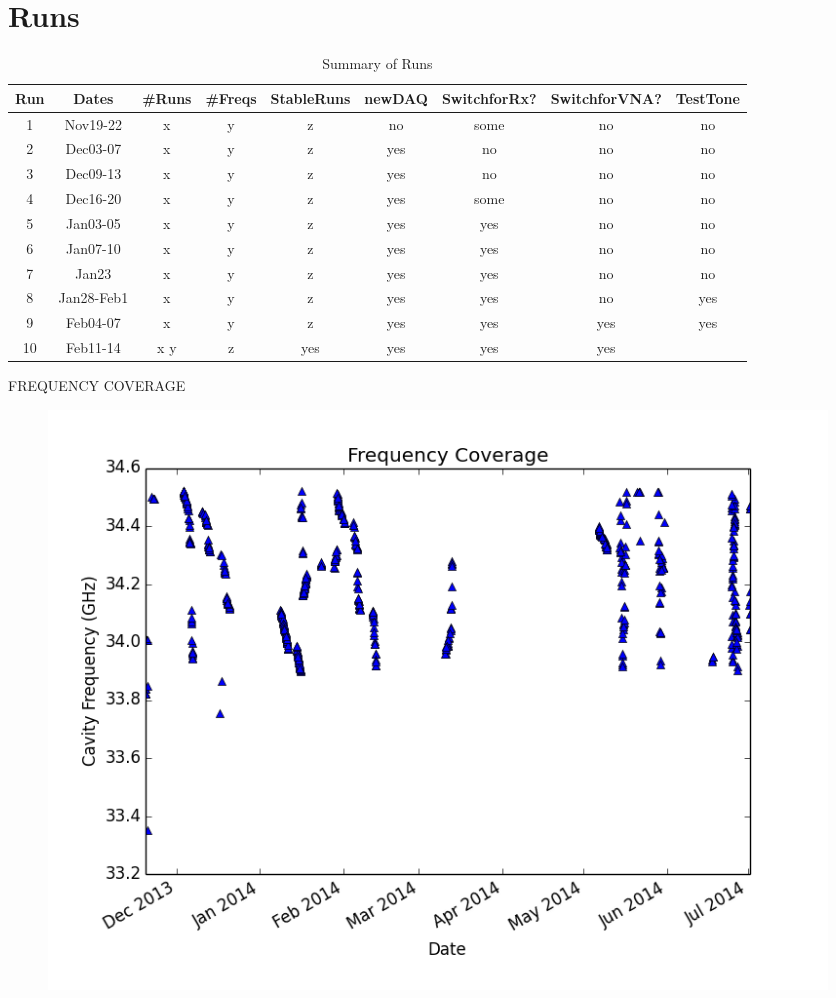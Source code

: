 \documentclass[11pt]{article}
\begin{document}
\section{Runs}

\begin{table}[ht]
\caption{Summary of Runs}

\begin{tabular}{c c c c c c c c c}
\hline\hline
Run & Dates & \#Runs & \#Freqs & StableRuns & newDAQ & SwitchforRx? & SwitchforVNA? & TestTone \\ [0.5ex]
\hline
1 & Nov19-22 & x & y & z & no & some & no & no \\
2 & Dec03-07 & x & y & z & yes & no & no & no \\
3 & Dec09-13 & x & y & z & yes & no & no & no \\
4 & Dec16-20 & x & y & z & yes & some & no & no \\
5 & Jan03-05 & x & y & z & yes & yes & no & no\\
6 & Jan07-10 & x & y & z & yes & yes & no & no \\
7 & Jan23 & x & y & z & yes & yes & no & no \\
8 & Jan28-Feb1 & x & y & z & yes & yes & no & yes \\
9 & Feb04-07 & x & y & z & yes & yes & yes & yes \\
10 & Feb11-14 & x y & z & yes & yes & yes & yes \\ [1ex]
\hline
\end{tabular}
\label{table:runsummary}
\end{table}

FREQUENCY COVERAGE
\begin{figure}
\includegraphics[scale=0.7]{frequencycoverage}
\end{figure}
\end{document}
